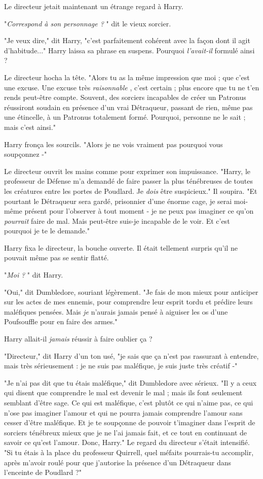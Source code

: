 Le directeur jetait maintenant un étrange regard à Harry.

"\emph{Correspond à son personnage ?} " dit le vieux sorcier.

"Je veux dire," dit Harry, "c'est parfaitement cohérent avec la façon dont il agit d'habitude..." Harry laissa sa phrase en suspens. Pourquoi \emph{l'avait-il}  formulé ainsi ?

Le directeur hocha la tête. "Alors tu as la même impression que moi ; que c'est une excuse. Une excuse très \emph{raisonnable} , c'est certain ; plus encore que tu ne t'en rends peut-être compte. Souvent, des sorciers incapables de créer un Patronus réussiront soudain en présence d'un vrai Détraqueur, passant de rien, même pas une étincelle, à un Patronus totalement formé. Pourquoi, personne ne le sait ; mais c'est ainsi."

Harry fronça les sourcils. "Alors je ne vois vraiment pas pourquoi vous soupçonnez -"

Le directeur ouvrit les mains comme pour exprimer son impuissance. "Harry, le professeur de Défense m'a demandé de faire passer la plus ténébreuses de toutes les créatures entre les portes de Poudlard. Je \emph{dois}  être suspicieux." Il soupira. "Et pourtant le Détraqueur sera gardé, prisonnier d'une énorme cage, je serai moi-même présent pour l'observer à tout moment - je ne peux pas imaginer ce qu'on \emph{pourrait}  faire de mal. Mais peut-être suis-je incapable de le voir. Et c'est pourquoi je te le demande."

Harry fixa le directeur, la bouche ouverte. Il était tellement surpris qu'il ne pouvait même pas se sentir flatté.

"\emph{Moi}  \emph{?} " dit Harry.

"Oui," dit Dumbledore, souriant légèrement. "Je fais de mon mieux pour anticiper sur les actes de mes ennemis, pour comprendre leur esprit tordu et prédire leurs maléfiques pensées. Mais \emph{je}  n'aurais jamais pensé à aiguiser les os d'une Poufsouffle pour en faire des armes."

Harry allait-il \emph{jamais}  réussir à faire oublier ça ?

"Directeur," dit Harry d'un ton usé, "je sais que ça n'est pas rassurant à entendre, mais très sérieusement : je ne suis pas maléfique, je suis juste très créatif -"

"Je n'ai pas dit que tu étais maléfique," dit Dumbledore avec sérieux. "Il y a ceux qui disent que comprendre le mal est devenir le mal ; mais ils font seulement semblant d'être sage. Ce qui est maléfique, c'est plutôt ce qui n'aime pas, ce qui n'ose pas imaginer l'amour et qui ne pourra jamais comprendre l'amour sans cesser d'être maléfique. Et je te soupçonne de pouvoir t'imaginer dans l'esprit de sorciers ténébreux mieux que je ne l'ai jamais fait, et ce tout en continuant de savoir ce qu'est l'amour. Donc, Harry." Le regard du directeur s'était intensifié. "Si tu étais à la place du professeur Quirrell, quel méfaits pourrais-tu accomplir, après m'avoir roulé pour que j'autorise la présence d'un Détraqueur dans l'enceinte de Poudlard ?"

